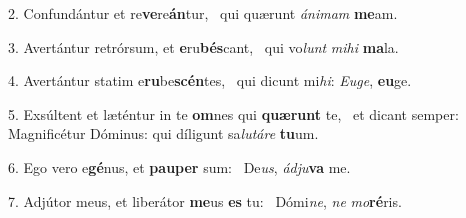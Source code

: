 2. Confundántur et re\textbf{ve}re\textbf{án}tur, \ast\  qui quærunt \textit{á}\textit{ni}\textit{mam} \textbf{me}am.\

3. Avertántur retrórsum, et \textbf{e}ru\textbf{bés}cant, \ast\  qui vo\textit{lunt} \textit{mi}\textit{hi} \textbf{ma}la.\

4. Avertántur statim e\textbf{ru}be\textbf{scén}tes, \ast\  qui dicunt mi\textit{hi}: \textit{Eu}\textit{ge}, \textbf{eu}ge.\

5. Exsúltent et læténtur in te \textbf{om}nes qui \textbf{quæ}\textbf{runt} te, \ast\  et dicant semper: Magnificétur Dóminus: qui díligunt sa\textit{lu}\textit{tá}\textit{re} \textbf{tu}um.\

6. Ego vero e\textbf{gé}nus, et \textbf{pau}\textbf{per} sum: \ast\  De\textit{us}, \textit{ád}\textit{ju}\textbf{va} me.\

7. Adjútor meus, et liberátor \textbf{me}us \textbf{es} tu: \ast\  Dómi\textit{ne}, \textit{ne} \textit{mo}\textbf{ré}ris.\

